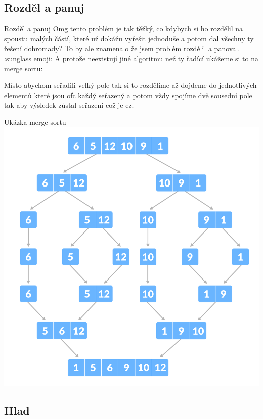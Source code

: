 \documentclass{beamer}
\begin{document}
\subsection{Rozděl a panuj}
\label{ssec:rozdel-a-panuj}


 \begin{frame}{Rozděl a panuj}
  Omg tento problém je tak těžký, co kdybych si ho rozdělil na spoustu malých
  částí, které už dokážu vyřešit jednoduše a potom dal všechny ty řešení
  dohromady? To by ale znamenalo že jsem problém rozdělil a panoval. :sunglass
  emoji:
\vfill
A protože neexistují jiné algoritmu než ty řadící ukážeme si to na merge sortu:

Místo abychom seřadili velký pole tak si to rozdělíme až dojdeme do jednotlivých
elementů které jsou ofc každý seřazený a potom vždy spojíme dvě sousední pole
tak aby výsledek zůstal seřazení což je ez.
 
\end{frame}

\begin{frame}{Ukázka merge sortu}
 \includegraphics[scale=0.4]{mergesort.png}
\end{frame}
\subsection{Hlad}
\label{ssec:hlad}
\end{document}
